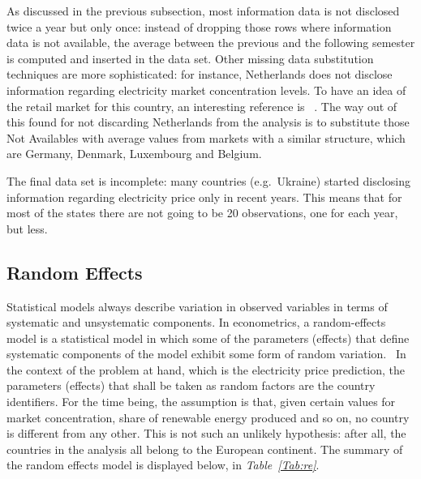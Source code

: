 \documentclass[a4paper,12pt]{book}
\begin{document}
As discussed in the previous subsection, most information data is not disclosed twice a year but only once: instead of dropping those rows where information data is not available, the average between the previous and the following semester is computed and inserted in the data set. Other missing data substitution techniques are more sophisticated: for instance, Netherlands does not disclose information regarding electricity market concentration levels. To have an idea of the retail market for this country, an interesting reference is ~\cite{mulder2019dutch}.  The way out of this found for not discarding Netherlands from the analysis is to substitute those Not Availables with average values from markets with a similar structure, which are Germany, Denmark, Luxembourg and Belgium.

The final data set is incomplete: many countries (e.g.~Ukraine) started disclosing information regarding electricity price only in recent years. This means that for most of the states there are not going to be 20 observations, one for each year, but less.

\subsection{Random Effects}

Statistical models always describe variation in observed variables in terms of systematic and unsystematic components. In econometrics, a random-effects model is a statistical model in which some of the parameters (effects) that define systematic components of the model exhibit some form of random variation.~\cite{salkind2010encyclopedia} In the context of the problem at hand, which is the electricity price prediction, the parameters (effects) that shall be taken as random factors are the country identifiers. For the time being, the assumption is that, given certain values for market concentration, share of renewable energy produced and so on, no country is different from any other. This is not such an unlikely hypothesis: after all, the countries in the analysis all belong to the European continent. The summary of the random effects model is displayed below, in \textit{Table~\ref{Tab:re}}.
\end{document}
